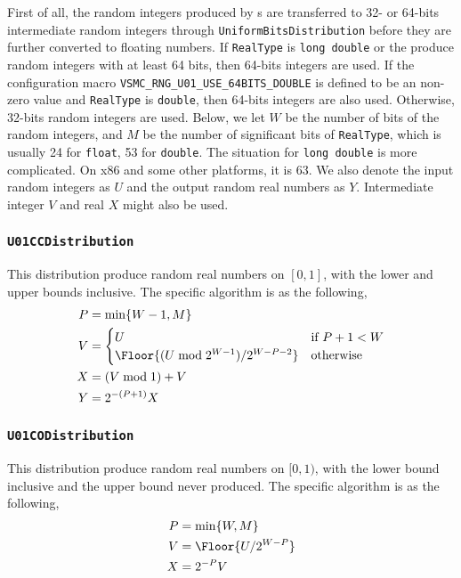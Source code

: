 First of all, the random integers produced by \rng{}s are transferred to 32- or
64-bits intermediate random integers through \verb|UniformBitsDistribution|
before they are further converted to floating numbers. If \verb|RealType| is
\verb|long double| or the \rng{} produce random integers with at least 64 bits,
then 64-bits integers are used. If the configuration macro
\verb|VSMC_RNG_U01_USE_64BITS_DOUBLE| is defined to be an non-zero value and
\verb|RealType| is \verb|double|, then 64-bits integers are also used.
Otherwise, 32-bits random integers are used. Below, we let $W$ be the number of
bits of the random integers, and $M$ be the number of significant bits of
\verb|RealType|, which is usually 24 for \verb|float|, 53 for \verb|double|.
The situation for \verb|long double| is more complicated. On x86 and some other
platforms, it is 63. We also denote the input random integers as $U$ and the
output random real numbers as $Y$. Intermediate integer $V$ and real $X$ might
also be used.

\subsubsection{\texttt{U01CCDistribution}}

This distribution produce random real numbers on $[0, 1]$, with the lower and
upper bounds inclusive. The specific algorithm is as the following,
\begin{align*}
  P &= \min\{W - 1, M\} \\
  V &= \begin{cases}
    U &\text{if } P + 1 < W \\
    \Floor{(U \bmod 2^{W - 1}) / 2^{W - P -2}} &\text{otherwise}
  \end{cases} \\
  X &= (V \bmod 1) + V \\
  Y &= 2^{-(P + 1)} X
\end{align*}

\subsubsection{\texttt{U01CODistribution}}

This distribution produce random real numbers on $[0, 1)$, with the lower bound
inclusive and the upper bound never produced. The specific algorithm is as the
following,
\begin{align*}
  P &= \min\{W, M\} \\
  V &= \Floor{U / 2^{W - P}} \\
  X &= 2^{-P} V
\end{align*}

